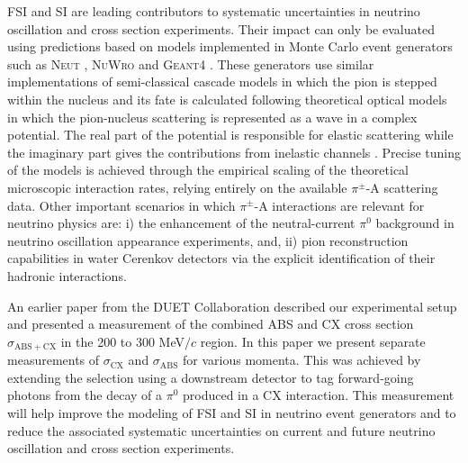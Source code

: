 FSI and SI are leading contributors to systematic uncertainties in neutrino oscillation and cross section experiments. Their impact can only be evaluated using predictions based on models implemented in Monte Carlo event generators such as \textsc{Neut} \cite{NEUT}, \textsc{NuWro} \cite{NuWro} and \textsc{Geant4} \cite{bertini}. These generators use similar implementations of semi-classical cascade models in which the pion is stepped within the nucleus and its fate is calculated following theoretical optical models in which the pion-nucleus scattering is represented as a wave in a complex potential. The real part of the potential is responsible for elastic scattering while the imaginary part gives the contributions from inelastic channels \cite{Oset,Salcedo}. Precise tuning of the models is achieved through the empirical scaling of the theoretical microscopic interaction rates, relying entirely on the available $\pi^{\pm}$-A scattering data. Other important scenarios in which $\pi^{\pm}$-A interactions are relevant for neutrino physics are: i) the enhancement of the neutral-current $\pi^{0}$ background in neutrino oscillation appearance experiments, and, ii) pion reconstruction capabilities in water Cerenkov detectors via the explicit identification of their hadronic interactions.

An earlier paper from the DUET Collaboration \cite{duet} described our experimental setup and presented a measurement of the combined ABS and CX cross section $\sigma_{\mathrm{ABS}+\mathrm{CX}}$ in the 200 to 300 MeV$/c$ region. In this paper we present separate measurements of $\sigma_{\mathrm{CX}}$ and $\sigma_{\mathrm{ABS}}$ for various momenta. This was achieved by extending the selection using a downstream detector to tag forward-going photons from the decay of a $\pi^0$ produced in a CX interaction. This measurement will help improve the modeling of FSI and SI in neutrino event generators and to reduce the associated systematic uncertainties on current and future neutrino oscillation and cross section experiments.
